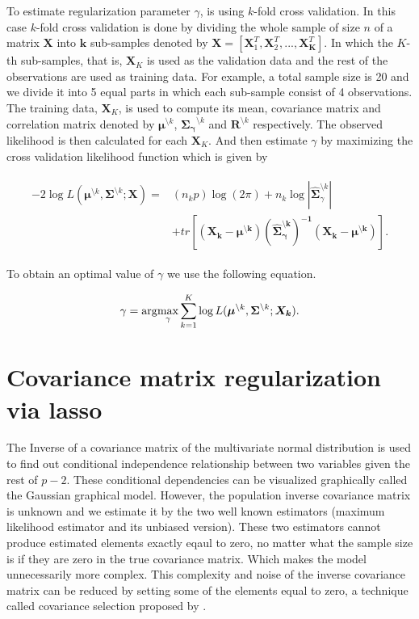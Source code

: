 To estimate regularization parameter $\gamma$, \cite{warton2008penalized} is using $k$-fold cross validation. In this case $k$-fold cross validation is done by dividing the whole sample of size $n$ of a matrix $\textbf{X}$ into $\textbf{k}$ sub-samples denoted by $\textbf{X} = [\textbf{X}_{1}^{T}, \textbf{X}_{2}^{T}, ...,\textbf{X}_{\textbf{K}}^{T}]$. In which the $K$-th sub-samples, that is, $\textbf{X}_{K}$ is used as the validation data and the rest of the observations are used as training data. For example, a total sample size is 20 and we divide it into 5 equal parts in which each sub-sample consist of 4 observations. The training data, $\textbf{X}_{K}$, is used to compute its mean, covariance matrix and correlation matrix denoted by $\boldsymbol{\mu}^{\setminus k}$, $\boldsymbol{\Sigma_{\gamma}}^{\setminus k}$ and $\boldsymbol{R}^{\setminus k}$ respectively. The observed likelihood is then calculated for each $\textbf{X}_{K}$. And then estimate $\gamma$ by maximizing the cross validation likelihood function which is given by

\begin{align}
\begin{split}
-2 \log L(\boldsymbol{\mu}^{\setminus k}, \boldsymbol{\Sigma}^{\setminus k};\boldsymbol{X})= {}& (n_{k}p)  \log(2\pi) + n_{k} \log\left|\boldsymbol{\hat{\Sigma}}_{\gamma}^{\setminus k}\right|  \\ &
+ tr[\boldsymbol{(X_{k}- \boldsymbol{\mu}^{\setminus k}) (\hat{\Sigma}_{\gamma}^{\setminus k})^{-1} (X_{k} - \boldsymbol{\mu}^{\setminus k})}].
\end{split}
\end{align}


To obtain an optimal value of $\gamma$ we use the following equation.

\begin{equation}
\gamma =  \arg\!\max_\gamma \sum_{k=1}^{K} \log L(\boldsymbol{\mu}^{\setminus k}, \boldsymbol{\Sigma}^{\setminus k};\boldsymbol{X_{k}}).
\end{equation} 

\section{Covariance matrix regularization via lasso}
The Inverse of a covariance matrix of the multivariate normal distribution is used to find out conditional independence relationship between two variables given the rest of $p-2$. These conditional dependencies can be visualized graphically called the Gaussian graphical model. However, the population inverse covariance matrix is unknown and we estimate it by the two well known estimators (maximum likelihood estimator and its unbiased version). These two estimators cannot produce estimated elements exactly eqaul to zero, no matter what the sample size is if they are zero in the true covariance matrix. Which makes the model unnecessarily more complex. This complexity and noise of the inverse covariance matrix can be reduced by setting some of the elements equal to zero, a technique called covariance selection proposed by \cite{dempster1972covariance}.  

